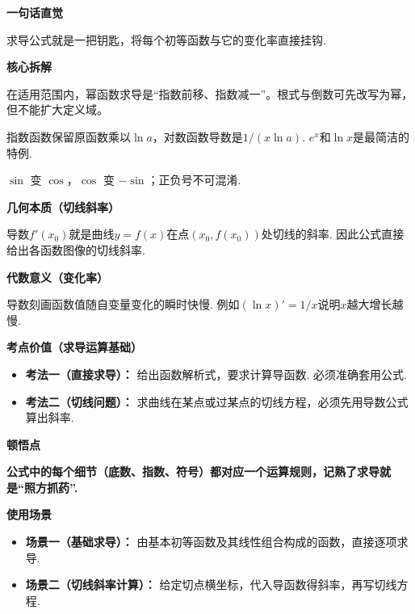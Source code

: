 \begin{explanationbox}
	\textbf{\textcolor{CExplanation}{一句话直觉}}

	求导公式就是一把钥匙，将每个初等函数与它的变化率直接挂钩.

	\medskip
	\textbf{\textcolor{CExplanation}{核心拆解}}
	\begin{description}[style=nextline, leftmargin=2.8em, labelsep=0.5em, itemsep=0.45em]
		\item[\textbf{要点一（幂函数导数）：}] 在适用范围内，幂函数求导是“指数前移、指数减一”。根式与倒数可先改写为幂，但不能扩大定义域。
		\item[\textbf{要点二（指对函数导数）：}] 指数函数保留原函数乘以$\ln a$，对数函数导数是$1/(x\ln a)$. $e^x$和$\ln x$是最简洁的特例.
		\item[\textbf{要点三（三角导数）：}] $\sin$ 变 $\cos$，$\cos$ 变 $-\sin$；正负号不可混淆.
	\end{description}

	\medskip
	\textbf{\textcolor{CExplanation}{几何本质（切线斜率）}}



	导数$f'(x_0)$就是曲线$y=f(x)$在点$(x_0,f(x_0))$处切线的斜率. 因此公式直接给出各函数图像的切线斜率.

	\medskip
	\textbf{\textcolor{CExplanation}{代数意义（变化率）}}

	导数刻画函数值随自变量变化的瞬时快慢. 例如$(\ln x)'=1/x$说明$x$越大增长越慢.

	\medskip
	\textbf{\textcolor{CExplanation}{考点价值（求导运算基础）}}
	\begin{itemize}[leftmargin=*, itemsep=0.5em, topsep=0.4em]
		\item \textbf{考法一（直接求导）：} 给出函数解析式，要求计算导函数. 必须准确套用公式.
		\item \textbf{考法二（切线问题）：} 求曲线在某点或过某点的切线方程，必须先用导数公式算出斜率.
	\end{itemize}

	\medskip
	\textbf{\textcolor{CExplanation}{顿悟点}}

	\textbf{公式中的每个细节（底数、指数、符号）都对应一个运算规则，记熟了求导就是“照方抓药”.}

	\medskip
	\textbf{\textcolor{CExplanation}{使用场景}}
	\begin{itemize}[leftmargin=*, itemsep=0.5em, topsep=0.4em]
		\item \textbf{场景一（基础求导）：} 由基本初等函数及其线性组合构成的函数，直接逐项求导.
		\item \textbf{场景二（切线斜率计算）：} 给定切点横坐标，代入导函数得斜率，再写切线方程.
	\end{itemize}


\end{explanationbox}
